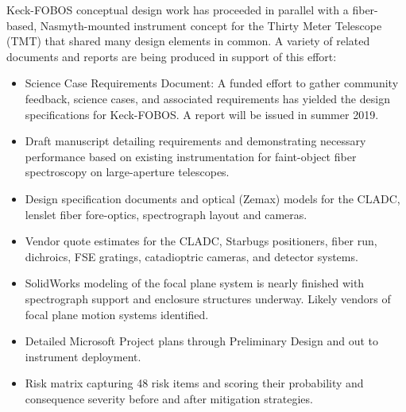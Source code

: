 \documentclass[oneside,11pt]{amsart}
\begin{document}
Keck-FOBOS conceptual design work has proceeded in parallel with a fiber-based, Nasmyth-mounted instrument concept for the Thirty Meter Telescope (TMT) that shared many design elements in common.  A variety of related documents and reports are being produced in support of this effort:

\begin{itemize}
	\item Science Case Requirements Document: A funded effort to gather community feedback, science cases, and associated requirements has yielded the design specifications for Keck-FOBOS.  A report will be issued in summer 2019.

	\item Draft manuscript detailing requirements and demonstrating necessary performance based on existing instrumentation for faint-object fiber spectroscopy on large-aperture telescopes.

	\item Design specification documents and optical (Zemax) models for the CLADC, lenslet fiber fore-optics, spectrograph layout and cameras.

	\item Vendor quote estimates for the CLADC, Starbugs positioners, fiber run, dichroics, FSE gratings, catadioptric cameras, and detector systems.

	\item SolidWorks modeling of the focal plane system is nearly finished with spectrograph support and enclosure structures underway.  Likely vendors of focal plane motion systems identified.

	\item Detailed Microsoft Project plans through Preliminary Design and out to instrument deployment.  

	\item Risk matrix capturing 48 risk items and scoring their probability and consequence severity before and after mitigation strategies.

\end{itemize}
\end{document}
